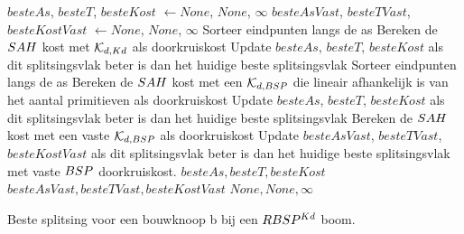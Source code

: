 \begin{dutchalgorithm}
    \begin{algorithmic}       
            \State $besteAs$, $besteT$, $besteKost$ $\gets None$, $None$, $\infty$
            \State $besteAsVast$, $besteTVast$, $besteKostVast$ $\gets None$, $None$, $\infty$
                \State Sorteer eindpunten langs de as
                    \State Bereken de $SAH$ kost met $\mathcal{K}_{d,Kd}$ als doorkruiskost
                    \State Update $besteAs$, $besteT$, $besteKost$ als dit splitsingsvlak beter is dan het huidige beste splitsingsvlak
                \EndFor        
            \EndFor
                \State Sorteer eindpunten langs de as
                    \State Bereken de $SAH$ kost met een $\mathcal{K}_{d,BSP}$ die lineair afhankelijk is van het aantal primitieven als doorkruiskost
                    \State Update $besteAs$, $besteT$, $besteKost$ als dit splitsingsvlak beter is dan het huidige beste splitsingsvlak    
                    \State Bereken de $SAH$ kost met een vaste $\mathcal{K}_{d,BSP}$ als doorkruiskost
                    \State Update $besteAsVast$, $besteTVast$, $besteKostVast$ als dit splitsingsvlak beter is dan het huidige beste splitsingsvlak met vaste $BSP$ doorkruiskost.   
                \EndFor                 
            \EndFor
                \State \Return $besteAs, besteT, besteKost$
            \EndIf
                \State \Return $besteAsVast, besteTVast, besteKostVast$
            \EndIf
            \State \Return $None, None, \infty$
        \EndFunction
    \end{algorithmic}
    \caption{Beste splitsing voor een bouwknoop b bij een $RBSP^{Kd}$ boom.}
    \label{alg:rbspkd-beste-split}
\end{dutchalgorithm}

